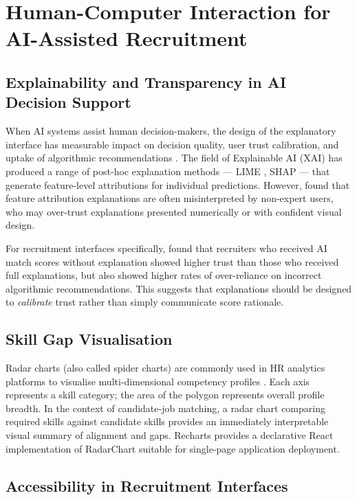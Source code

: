 \section{Human-Computer Interaction for AI-Assisted Recruitment}
\label{sec:hci}

\subsection{Explainability and Transparency in AI Decision Support}

When AI systems assist human decision-makers, the design of the explanatory interface has measurable impact on decision quality, user trust calibration, and uptake of algorithmic recommendations \citep{Amershi2019}. The field of Explainable AI (XAI) has produced a range of post-hoc explanation methods --- LIME \citep{Ribeiro2016}, SHAP \citep{Lundberg2017} --- that generate feature-level attributions for individual predictions. However, \citet{Chromik2021} found that feature attribution explanations are often misinterpreted by non-expert users, who may over-trust explanations presented numerically or with confident visual design.

For recruitment interfaces specifically, \citet{Raghavan2020} found that recruiters who received AI match scores without explanation showed higher trust than those who received full explanations, but also showed higher rates of over-reliance on incorrect algorithmic recommendations. This suggests that explanations should be designed to \textit{calibrate} trust rather than simply communicate score rationale.

\subsection{Skill Gap Visualisation}

Radar charts (also called spider charts) are commonly used in HR analytics platforms to visualise multi-dimensional competency profiles \citep{Kandel2012}. Each axis represents a skill category; the area of the polygon represents overall profile breadth. In the context of candidate-job matching, a radar chart comparing required skills against candidate skills provides an immediately interpretable visual summary of alignment and gaps. Recharts \citep{Recharts2023} provides a declarative React implementation of RadarChart suitable for single-page application deployment.

\subsection{Accessibility in Recruitment Interfaces}

